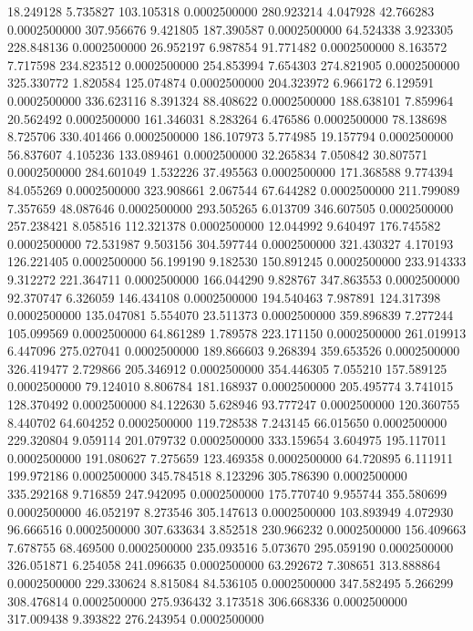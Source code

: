 18.249128 5.735827 103.105318 0.0002500000
280.923214 4.047928 42.766283 0.0002500000
307.956676 9.421805 187.390587 0.0002500000
64.524338 3.923305 228.848136 0.0002500000
26.952197 6.987854 91.771482 0.0002500000
8.163572 7.717598 234.823512 0.0002500000
254.853994 7.654303 274.821905 0.0002500000
325.330772 1.820584 125.074874 0.0002500000
204.323972 6.966172 6.129591 0.0002500000
336.623116 8.391324 88.408622 0.0002500000
188.638101 7.859964 20.562492 0.0002500000
161.346031 8.283264 6.476586 0.0002500000
78.138698 8.725706 330.401466 0.0002500000
186.107973 5.774985 19.157794 0.0002500000
56.837607 4.105236 133.089461 0.0002500000
32.265834 7.050842 30.807571 0.0002500000
284.601049 1.532226 37.495563 0.0002500000
171.368588 9.774394 84.055269 0.0002500000
323.908661 2.067544 67.644282 0.0002500000
211.799089 7.357659 48.087646 0.0002500000
293.505265 6.013709 346.607505 0.0002500000
257.238421 8.058516 112.321378 0.0002500000
12.044992 9.640497 176.745582 0.0002500000
72.531987 9.503156 304.597744 0.0002500000
321.430327 4.170193 126.221405 0.0002500000
56.199190 9.182530 150.891245 0.0002500000
233.914333 9.312272 221.364711 0.0002500000
166.044290 9.828767 347.863553 0.0002500000
92.370747 6.326059 146.434108 0.0002500000
194.540463 7.987891 124.317398 0.0002500000
135.047081 5.554070 23.511373 0.0002500000
359.896839 7.277244 105.099569 0.0002500000
64.861289 1.789578 223.171150 0.0002500000
261.019913 6.447096 275.027041 0.0002500000
189.866603 9.268394 359.653526 0.0002500000
326.419477 2.729866 205.346912 0.0002500000
354.446305 7.055210 157.589125 0.0002500000
79.124010 8.806784 181.168937 0.0002500000
205.495774 3.741015 128.370492 0.0002500000
84.122630 5.628946 93.777247 0.0002500000
120.360755 8.440702 64.604252 0.0002500000
119.728538 7.243145 66.015650 0.0002500000
229.320804 9.059114 201.079732 0.0002500000
333.159654 3.604975 195.117011 0.0002500000
191.080627 7.275659 123.469358 0.0002500000
64.720895 6.111911 199.972186 0.0002500000
345.784518 8.123296 305.786390 0.0002500000
335.292168 9.716859 247.942095 0.0002500000
175.770740 9.955744 355.580699 0.0002500000
46.052197 8.273546 305.147613 0.0002500000
103.893949 4.072930 96.666516 0.0002500000
307.633634 3.852518 230.966232 0.0002500000
156.409663 7.678755 68.469500 0.0002500000
235.093516 5.073670 295.059190 0.0002500000
326.051871 6.254058 241.096635 0.0002500000
63.292672 7.308651 313.888864 0.0002500000
229.330624 8.815084 84.536105 0.0002500000
347.582495 5.266299 308.476814 0.0002500000
275.936432 3.173518 306.668336 0.0002500000
317.009438 9.393822 276.243954 0.0002500000

